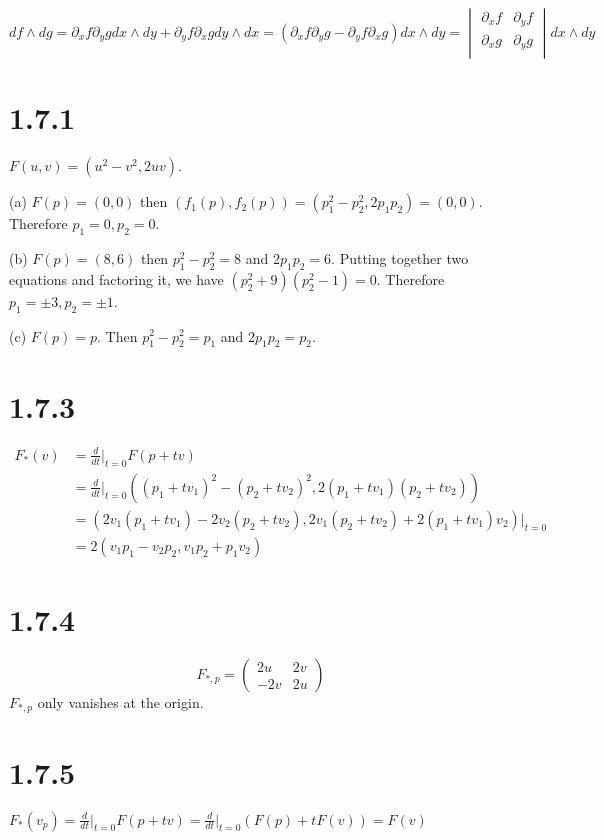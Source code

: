 \documentclass[12pt]{article}
\begin{document}
$ df\wedge dg = \partial_xf \partial_y g dx \wedge dy + \partial_y f\partial_x g dy \wedge dx = ( \partial_xf \partial_y g - \partial_y f\partial_x g) dx \wedge dy = 
\begin{vmatrix}
	\partial_x f & \partial_y f \\
	\partial_x g & \partial_y g \\
\end{vmatrix}
dx \wedge dy
$

\section*{1.7.1}
$F(u, v) = (u^2 -v^2, 2uv)$.

(a) $F(p)=(0, 0)$ then $(f_1(p), f_2(p)) = (p_1^2 - p_2^2, 2p_1p_2) = (0, 0)$. Therefore $p_1 = 0, p_2 = 0$.

(b) $F(p) = (8, 6)$ then $p_1^2 - p_2^2 = 8$ and $2p_1p_2=6$. Putting together two equations and factoring it, we have $(p_2^2 + 9)(p_2^2 - 1) = 0$. Therefore $p_1 = \pm 3, p_2 = \pm 1$.

(c) $F(p) = p$. Then $p_1^2 - p_2^2 = p_1$ and $2p_1p_2 = p_2$.

\section*{1.7.3}
$$\begin{aligned}
	 F_*(v) &= \frac{d}{dt}\big|_{t=0} F(p+ tv) \\ 
	   &= \frac{d}{dt}\big|_{t=0} ((p_1 + tv_1)^2 - (p_2 + tv_2)^2, 2(p_1+tv_1)(p_2+tv_2))  \\
	   &= ( 2v_1(p_1 + tv_1) - 2v_2(p_2 + tv_2), 2v_1(p_2+tv_2) + 2(p_1+tv_1)v_2)\big|_{t=0} \\
	   &= 2(v_1p_1 - v_2p_2, v_1p_2 + p_1v_2)
\end{aligned}$$

\section*{1.7.4}
$$
 F_{*, p} = \begin{pmatrix}
 	2u & 2v \\
 	-2v & 2u
 \end{pmatrix}
$$
$F_{*, p}$ only vanishes at the origin. 

\section*{1.7.5}
$F_*(v_p) = \frac{d}{dt}\big|_{t=0} F(p + tv) = \frac{d}{dt}\big|_{t=0}(F(p) + tF(v)) = F(v)$
\end{document}

